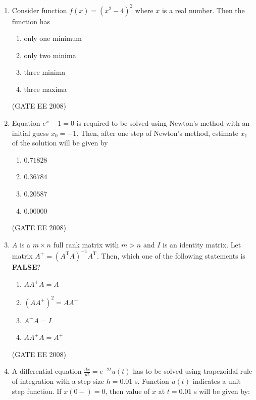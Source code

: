 \documentclass[journal,12pt,onecolumn]{IEEEtran}
\theoremstyle{remark}
\begin{document}
\begin{enumerate}[start=1, label=Q.\arabic*]
\item Consider function $f(x)=(x^2-4)^2$ where $x$ is a real number. Then the function has

\begin{enumerate}
    \item only one minimum
    \item only two minima
    \item three minima
    \item three maxima
\end{enumerate}
\hfill (GATE EE 2008)



\item Equation $e^x - 1 = 0$ is required to be solved using Newton's method with an initial guess $x_0 = -1$. Then, after one step of Newton's method, estimate $x_1$ of the solution will be given by

\begin{multicols}{4}
\begin{enumerate}
    \item $0.71828$
    \item $0.36784$
    \item $0.20587$
    \item $0.00000$
\end{enumerate}
\end{multicols}
\hfill (GATE EE 2008)

\item $A$ is a $m \times n$ full rank matrix with $m>n$ and $I$ is an identity matrix. Let matrix $A^{+}=(A^{\text{T}}A)^{-1}A^{\text{T}}$. Then, which one of the following statements is \textbf{FALSE}?

\begin{multicols}{2}
\begin{enumerate}
    \item $AA^{+}A = A$
    \item $(AA^{+})^2 = AA^{+}$
    \item $A^{+}A = I$
    \item $A A^{+}A = A^{+}$
\end{enumerate}
\end{multicols}
\hfill (GATE EE 2008)



\item A differential equation $\frac{dx}{dt} = e^{-2t}u(t)$ has to be solved using trapezoidal rule of integration with a step size $h=0.01$ s. Function $u(t)$ indicates a unit step function. If $x(0-) = 0$, then value of $x$ at $t=0.01$ s will be given by:


\end{enumerate}
\end{document}
